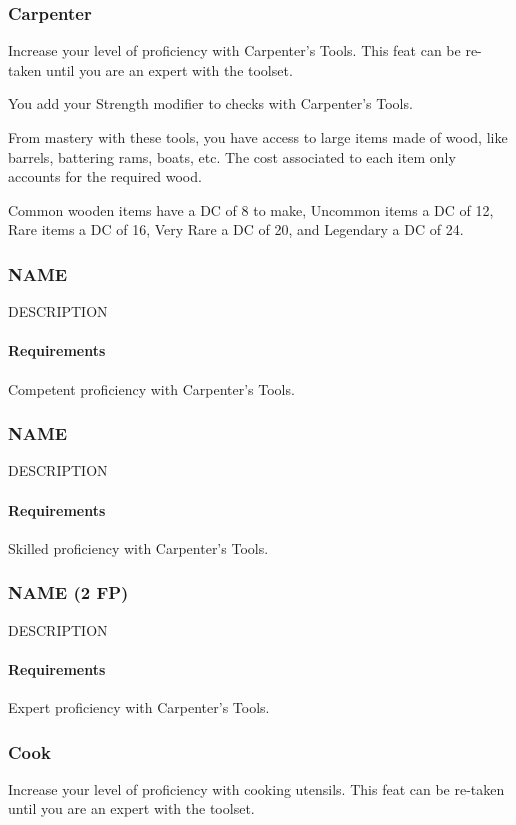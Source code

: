 \subsubsection{Carpenter} \label{feat::carpenter}
    Increase your level of proficiency with Carpenter's Tools.
    This feat can be re-taken until you are an expert with the toolset.

    You add your Strength modifier to checks with Carpenter's Tools.

    From mastery with these tools, you have access to large items made of wood, like barrels, battering rams, boats, etc.
    The cost associated to each item only accounts for the required wood.

    Common wooden items have a DC of 8 to make, Uncommon items a DC of 12, Rare items a DC of 16, Very Rare a DC of 20, and Legendary a DC of 24.
\subsubsection{NAME} \label{feat::name}
    DESCRIPTION
    \paragraph{Requirements} Competent proficiency with Carpenter's Tools.
\subsubsection{NAME} \label{feat::name}
    DESCRIPTION
    \paragraph{Requirements} Skilled proficiency with Carpenter's Tools.
\subsubsection{NAME (2 FP)} \label{feat::name}
    DESCRIPTION
    \paragraph{Requirements} Expert proficiency with Carpenter's Tools.

\subsubsection{Cook} \label{feat::cook}
    Increase your level of proficiency with cooking utensils.
    This feat can be re-taken until you are an expert with the toolset.

